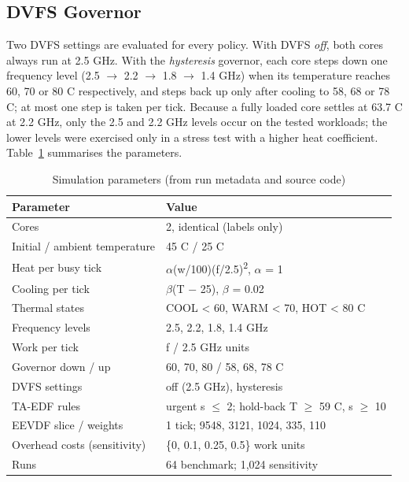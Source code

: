 \documentclass[conference]{IEEEtran}
\begin{document}
\subsection{DVFS Governor}\label{sec:model-dvfs}
Two DVFS settings are evaluated for every policy. With DVFS \emph{off}, both cores always run at 2.5 GHz. With the \emph{hysteresis} governor, each core steps down one frequency level (2.5 $\rightarrow$ 2.2 $\rightarrow$ 1.8 $\rightarrow$ 1.4 GHz) when its temperature reaches 60, 70 or 80 \textdegree{}C respectively, and steps back up only after cooling to 58, 68 or 78 \textdegree{}C; at most one step is taken per tick. Because a fully loaded core settles at 63.7 \textdegree{}C at 2.2 GHz, only the 2.5 and 2.2 GHz levels occur on the tested workloads; the lower levels were exercised only in a stress test with a higher heat coefficient. Table~\ref{tab:params} summarises the parameters.

\begin{table}[!t]
\centering
\footnotesize
\caption{Simulation parameters (from run metadata and source code)}
\label{tab:params}
\setlength{\tabcolsep}{3pt}
\begin{tabular}{ll}
\toprule
Parameter & Value \\
\midrule
Cores & 2, identical (labels only) \\
Initial / ambient temperature & 45 \textdegree{}C / 25 \textdegree{}C \\
Heat per busy tick & $\alpha$(w/100)(f/2.5)\textsuperscript{2}, $\alpha$ = 1 \\
Cooling per tick & $\beta$(T $-$ 25), $\beta$ = 0.02 \\
Thermal states & COOL < 60, WARM < 70, HOT < 80 \textdegree{}C \\
Frequency levels & 2.5, 2.2, 1.8, 1.4 GHz \\
Work per tick & f / 2.5 GHz units \\
Governor down / up & 60, 70, 80 / 58, 68, 78 \textdegree{}C \\
DVFS settings & off (2.5 GHz), hysteresis \\
TA-EDF rules & urgent s $\leq$ 2; hold-back T $\geq$ 59 \textdegree{}C, s $\geq$ 10 \\
EEVDF slice / weights & 1 tick; 9548, 3121, 1024, 335, 110 \\
Overhead costs (sensitivity) & \{0, 0.1, 0.25, 0.5\} work units \\
Runs & 64 benchmark; 1,024 sensitivity \\
\bottomrule
\end{tabular}
\end{table}
\end{document}
